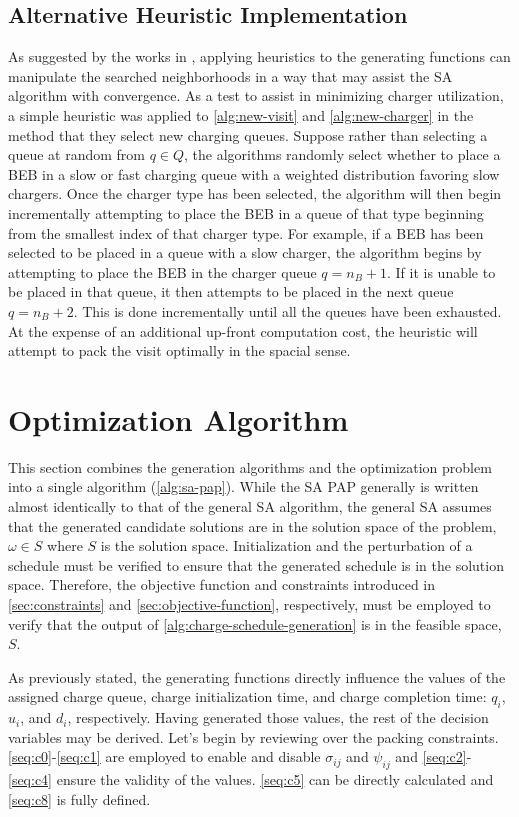 \documentclass[energies,article,submit,moreauthors]{Definitions/mdpi}
\begin{document}
\subsection{Alternative Heuristic Implementation}
\label{sec:heuristic-implementation}
As suggested by the works in \cite{Zhang_2010,Xinchao_2011}, applying heuristics to the generating functions can
manipulate the searched neighborhoods in a way that may assist the SA algorithm with convergence. As a test to assist in
minimizing charger utilization, a simple heuristic was applied to \ref{alg:new-visit} and \ref{alg:new-charger} in the
method that they select new charging queues. Suppose rather than selecting a queue at random from \(q \in Q\), the
algorithms randomly select whether to place a BEB in a slow or fast charging queue with a weighted distribution favoring
slow chargers. Once the charger type has been selected, the algorithm will then begin incrementally attempting to place
the BEB in a queue of that type beginning from the smallest index of that charger type. For example, if a BEB has been
selected to be placed in a queue with a slow charger, the algorithm begins by attempting to place the BEB in the charger
queue \(q = n_B + 1\). If it is unable to be placed in that queue, it then attempts to be placed in the next queue \(q =
n_B + 2\). This is done incrementally until all the queues have been exhausted. At the expense of an additional up-front
computation cost, the heuristic will attempt to pack the visit optimally in the spacial sense.
\section{Optimization Algorithm}
\label{sec:optimization-algorithm}
This section combines the generation algorithms and the optimization problem into a single algorithm (\ref{alg:sa-pap}).
While the SA PAP generally is written almost identically to that of the general SA algorithm, the general SA assumes
that the generated candidate solutions are in the solution space of the problem, \(\omega \in S\) where \(S\) is the solution
space. Initialization and the perturbation of a schedule must be verified to ensure that the generated schedule is in
the solution space. Therefore, the objective function and constraints introduced in \ref{sec:constraints} and
\ref{sec:objective-function}, respectively, must be employed to verify that the output of
\ref{alg:charge-schedule-generation} is in the feasible space, \(S\).

As previously stated, the generating functions directly influence the values of the assigned charge queue, charge
initialization time, and charge completion time: \(q_i\), \(u_i\), and \(d_i\), respectively. Having generated those values,
the rest of the decision variables may be derived. Let's begin by reviewing over the packing constraints.
\ref{seq:c0}-\ref{seq:c1} are employed to enable and disable \(\sigma_{ij}\) and \(\psi_{ij}\) and \ref{seq:c2}-\ref{seq:c4} ensure
the validity of the values. \ref{seq:c5} can be directly calculated and \ref{seq:c8} is fully defined.
\end{document}
